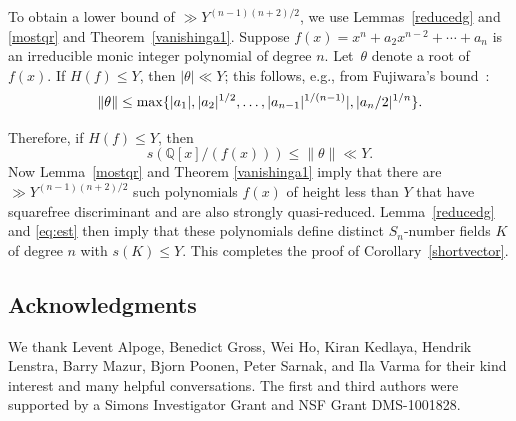 \documentclass[11pt]{article}
\def\Q{{\mathbb Q}}
\def\Q{{\mathbb Q}}
\def\max{{\rm max}}
\begin{document}
To obtain a lower bound of $\gg Y^{(n-1)(n+2)/2}$, we use
Lemmas~\ref{reducedg} and \ref{mostqr} and
Theorem~\ref{vanishinga1}. Suppose $f(x)=x^n + a_2x^{n-2} + \cdots +
a_n$ is an irreducible monic integer polynomial of degree $n$.
Let~$\theta$ denote a root of $f(x)$.
If $H(f)\leq Y$, then $|\theta|\ll Y$;
this follows, e.g., from Fujiwara's bound~\cite{Fujiwara}:
$$ \|\theta\|\leq  \max\{ |a_1|,|a_2|^{1/2},\ldots,|a_{n-1}|^{1/(n-1)}|, |a_n/2|^{1/n}\}.$$

Therefore, if $H(f)\leq Y$, then
\begin{equation}\label{eq:est}
s(\Q[x]/(f(x))) \leq \|\theta\| \ll Y.
\end{equation}
Now Lemma~\ref{mostqr} and Theorem \ref{vanishinga1} imply that there are
$\gg Y^{(n-1)(n+2)/2}$ such polynomials $f(x)$ of height less than $Y$ that have squarefree discriminant and are also strongly
quasi-reduced. Lemma~\ref{reducedg} and \eqref{eq:est} then imply that
these polynomials define distinct $S_n$-number fields $K$ of degree $n$ with
$s(K)\leq Y$. This completes the proof of Corollary~\ref{shortvector}.



\subsection*{Acknowledgments}

We thank Levent Alpoge, Benedict Gross, Wei Ho, Kiran Kedlaya, Hendrik
Lenstra, Barry Mazur, Bjorn Poonen, Peter Sarnak, and Ila Varma for
their kind interest and many helpful conversations.  The first and third
authors were supported by a Simons Investigator Grant and NSF Grant DMS-1001828.

\bigskip
\end{document}
